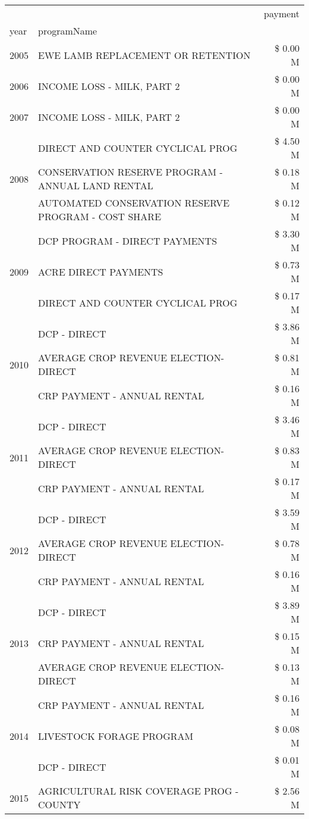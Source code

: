 \begin{tabular}{llr}
\toprule
 &  & payment \\
year & programName &  \\
\midrule
2005 & EWE LAMB REPLACEMENT OR RETENTION & \$ 0.00 M \\
\cline{1-3}
2006 & INCOME LOSS - MILK, PART 2 & \$ 0.00 M \\
\cline{1-3}
2007 & INCOME LOSS - MILK, PART 2 & \$ 0.00 M \\
\cline{1-3}
\multirow[t]{3}{*}{2008} & DIRECT AND COUNTER CYCLICAL PROG & \$ 4.50 M \\
 & CONSERVATION RESERVE PROGRAM - ANNUAL LAND RENTAL & \$ 0.18 M \\
 & AUTOMATED CONSERVATION RESERVE PROGRAM - COST SHARE & \$ 0.12 M \\
\cline{1-3}
\multirow[t]{3}{*}{2009} & DCP PROGRAM - DIRECT PAYMENTS & \$ 3.30 M \\
 & ACRE DIRECT PAYMENTS & \$ 0.73 M \\
 & DIRECT AND COUNTER CYCLICAL PROG & \$ 0.17 M \\
\cline{1-3}
\multirow[t]{3}{*}{2010} & DCP - DIRECT & \$ 3.86 M \\
 & AVERAGE CROP REVENUE ELECTION-DIRECT & \$ 0.81 M \\
 & CRP PAYMENT - ANNUAL RENTAL & \$ 0.16 M \\
\cline{1-3}
\multirow[t]{3}{*}{2011} & DCP - DIRECT & \$ 3.46 M \\
 & AVERAGE CROP REVENUE ELECTION-DIRECT & \$ 0.83 M \\
 & CRP PAYMENT - ANNUAL RENTAL & \$ 0.17 M \\
\cline{1-3}
\multirow[t]{3}{*}{2012} & DCP - DIRECT & \$ 3.59 M \\
 & AVERAGE CROP REVENUE ELECTION-DIRECT & \$ 0.78 M \\
 & CRP PAYMENT - ANNUAL RENTAL & \$ 0.16 M \\
\cline{1-3}
\multirow[t]{3}{*}{2013} & DCP - DIRECT & \$ 3.89 M \\
 & CRP PAYMENT - ANNUAL RENTAL & \$ 0.15 M \\
 & AVERAGE CROP REVENUE ELECTION-DIRECT & \$ 0.13 M \\
\cline{1-3}
\multirow[t]{3}{*}{2014} & CRP PAYMENT - ANNUAL RENTAL & \$ 0.16 M \\
 & LIVESTOCK FORAGE PROGRAM & \$ 0.08 M \\
 & DCP - DIRECT & \$ 0.01 M \\
\cline{1-3}
\multirow[t]{3}{*}{2015} & AGRICULTURAL RISK COVERAGE PROG - COUNTY & \$ 2.56 M \\

\end{tabular}
